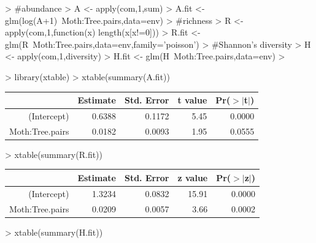 \documentclass[12pt]{article}
\begin{document}
\begin{Schunk}
\begin{Sinput}
>                                         #abundance
> A <- apply(com,1,sum)
> A.fit <- glm(log(A+1)~Moth:Tree.pairs,data=env)
>                                         #richness
> R <- apply(com,1,function(x) length(x[x!=0]))
> R.fit <- glm(R~Moth:Tree.pairs,data=env,family='poisson')
>                                         #Shannon's diversity
> H <- apply(com,1,diversity)
> H.fit <- glm(H~Moth:Tree.pairs,data=env)
> 
\end{Sinput}
\end{Schunk}

\begin{Schunk}
\begin{Sinput}
> library(xtable)
> xtable(summary(A.fit))
\end{Sinput}
\begin{table}[ht]
\begin{center}
\begin{tabular}{rrrrr}
  \hline
 & Estimate & Std. Error & t value & Pr($>$$|$t$|$) \\ 
  \hline
(Intercept) & 0.6388 & 0.1172 & 5.45 & 0.0000 \\ 
  Moth:Tree.pairs & 0.0182 & 0.0093 & 1.95 & 0.0555 \\ 
   \hline
\end{tabular}
\end{center}
\end{table}\begin{Sinput}
> xtable(summary(R.fit))
\end{Sinput}
\begin{table}[ht]
\begin{center}
\begin{tabular}{rrrrr}
  \hline
 & Estimate & Std. Error & z value & Pr($>$$|$z$|$) \\ 
  \hline
(Intercept) & 1.3234 & 0.0832 & 15.91 & 0.0000 \\ 
  Moth:Tree.pairs & 0.0209 & 0.0057 & 3.66 & 0.0002 \\ 
   \hline
\end{tabular}
\end{center}
\end{table}\begin{Sinput}
> xtable(summary(H.fit))
\end{Sinput}

\end{Schunk}
\end{document}
